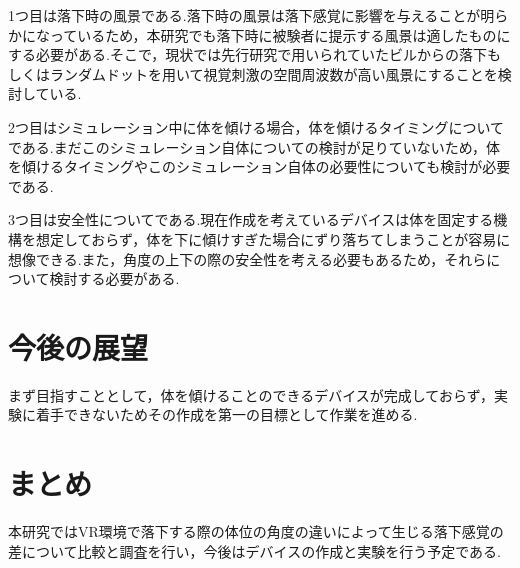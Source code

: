 \documentclass[uplatex]{jsarticle}
\begin{document}
1つ目は落下時の風景である.落下時の風景は落下感覚に影響を与えることが明らかになっているため，本研究でも落下時に被験者に提示する風景は適したものにする必要がある.そこで，現状では先行研究で用いられていたビルからの落下もしくはランダムドットを用いて視覚刺激の空間周波数が高い風景にすることを検討している.

2つ目はシミュレーション中に体を傾ける場合，体を傾けるタイミングについてである.まだこのシミュレーション自体についての検討が足りていないため，体を傾けるタイミングやこのシミュレーション自体の必要性についても検討が必要である.

3つ目は安全性についてである.現在作成を考えているデバイスは体を固定する機構を想定しておらず，体を下に傾けすぎた場合にずり落ちてしまうことが容易に想像できる.また，角度の上下の際の安全性を考える必要もあるため，それらについて検討する必要がある.

\section{今後の展望}
まず目指すこととして，体を傾けることのできるデバイスが完成しておらず，実験に着手できないためその作成を第一の目標として作業を進める.

\section{まとめ}
本研究ではVR環境で落下する際の体位の角度の違いによって生じる落下感覚の差について比較と調査を行い，今後はデバイスの作成と実験を行う予定である.


 
\end{document}
